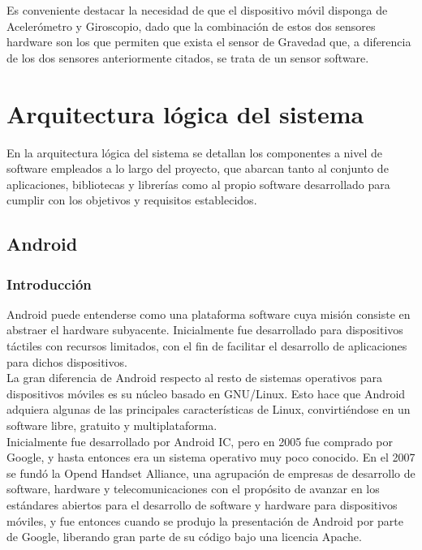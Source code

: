 Es conveniente destacar la necesidad de que el dispositivo móvil disponga de Acelerómetro y Giroscopio, dado que la combinación de estos dos sensores hardware son los que permiten que exista el sensor de Gravedad que, a diferencia de los dos sensores anteriormente citados, se trata de un sensor software.

\section{Arquitectura lógica del sistema}

En la arquitectura lógica del sistema se detallan los componentes a nivel de software empleados a lo largo del proyecto, que abarcan tanto al conjunto de aplicaciones, bibliotecas y librerías como al propio software desarrollado para cumplir con los objetivos y requisitos establecidos.

\subsection{Android}

\subsubsection{Introducción}

Android puede entenderse como una plataforma software cuya misión consiste en abstraer el hardware subyacente. Inicialmente fue desarrollado para dispositivos táctiles con recursos limitados, con el fin de facilitar el desarrollo de aplicaciones para dichos dispositivos.\\

La gran diferencia de Android respecto al resto de sistemas operativos para dispositivos móviles es su núcleo basado en GNU/Linux. Esto hace que Android adquiera algunas de las principales características de Linux, convirtiéndose en un software libre, gratuito y multiplataforma. \\

Inicialmente fue desarrollado por Android IC, pero en 2005 fue comprado por Google, y hasta entonces era un sistema operativo muy poco conocido. En el 2007 se fundó la Opend Handset Alliance, una agrupación de empresas de desarrollo de software, hardware y telecomunicaciones con el propósito de avanzar en los estándares abiertos para el desarrollo de software y hardware para dispositivos móviles, y fue entonces cuando se produjo la presentación de Android por parte de Google, liberando gran parte de su código bajo una licencia Apache.\\

